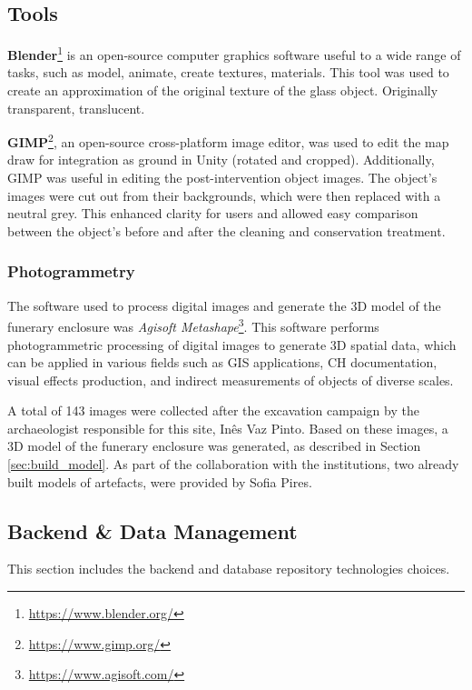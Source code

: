 \subsection{Tools}
\textbf{Blender}\footnote{\url{https://www.blender.org/}} is an open-source computer graphics software useful to a wide range of tasks, such as model, animate, create textures, materials. 
This tool was used to create an approximation of the original texture of the glass object. Originally transparent, translucent.

\textbf{GIMP}\footnote{\url{https://www.gimp.org/}}, an open-source cross-platform image editor, was used to edit the map draw for integration as ground in Unity (rotated and cropped).
Additionally, GIMP was useful in editing the post-intervention object images. The object's images were cut out from their backgrounds, which were then replaced with a neutral grey. 
This enhanced clarity for users and allowed easy comparison between the object's before and after the cleaning and conservation treatment.

\subsubsection{Photogrammetry}
\label{sec:photogrammetry_tool} 

The software used to process digital images and generate the \gls{3D} model of the funerary enclosure was \textit{Agisoft Metashape}\footnote{\url{https://www.agisoft.com/}}.
This software performs photogrammetric processing of digital images to generate \gls{3D} spatial data, which can be applied in various fields such as \gls{GIS} applications, \gls{CH} documentation, visual effects production, and indirect measurements of objects of diverse scales. 

 A total of 143 images were collected after the excavation campaign by the archaeologist responsible for this site, Inês Vaz Pinto.
Based on these images, a \gls{3D} model of the funerary enclosure was generated, as described in Section \ref{sec:build_model}.
As part of the collaboration with the institutions, two already built models of artefacts, were provided by Sofia Pires.

\subsection{Backend \& Data Management}
This section includes the backend and database repository technologies choices. 
